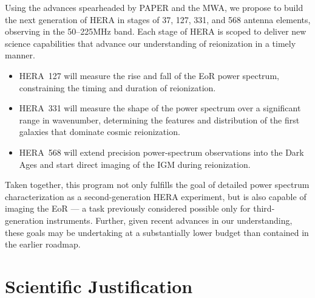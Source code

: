 \documentclass[preprint]{aastex}
\begin{document}
Using the advances spearheaded by 
PAPER and the MWA,
we propose to build the next generation of HERA in stages of 37, 127, 331, and 568 antenna elements,
observing in the 50--225MHz band. 
Each stage of HERA is scoped to deliver new science capabilities that advance our 
understanding of reionization in a timely manner.
\begin{itemize}\setlength{\parskip}{0pt}\itemsep0pt
\item HERA~127 will measure the rise and fall of the EoR power
spectrum, constraining the timing and duration of reionization.
\item HERA~331 will measure the shape of the power spectrum over
a significant range in wavenumber, determining the features and distribution of
the first galaxies that dominate cosmic reionization.
\item HERA~568 will extend precision power-spectrum observations
into the Dark Ages and start direct imaging of the IGM during reionization.
\end{itemize}
{ \setlength{\parindent}{0cm}
Taken together, this program 
not only fulfills the goal of detailed power spectrum
characterization as a second-generation HERA experiment, but is also
capable of imaging the EoR --- a task previously considered possible only for
third-generation instruments.  Further, given recent advances in our understanding, these goals may be 
undertaking at a substantially lower budget than contained in the earlier roadmap.}

\vspace{-0.25in}
\section{Scientific Justification}
\label{SJsec}
\end{document}
